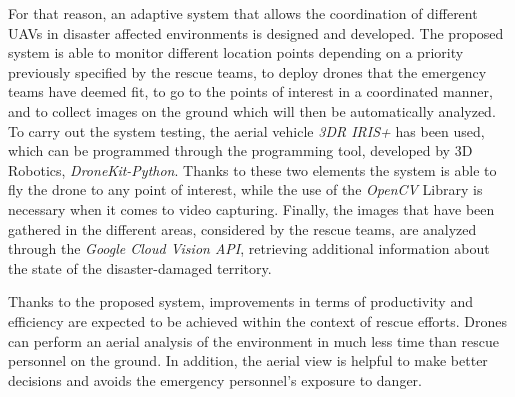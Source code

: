 For that reason, an adaptive system that allows the coordination of different \acs{UAV}s in disaster affected environments is designed and developed. The proposed system is able to monitor different location points depending on a priority previously specified by the rescue teams, to deploy drones that the emergency teams have deemed fit, to go to the points of interest in a coordinated manner, and to collect images on the ground which will then be automatically analyzed. To carry out the system testing, the aerial vehicle \textit{3DR IRIS+} has been used, which can be programmed through the programming tool, developed by 3D Robotics, \textit{DroneKit-Python}. Thanks to these two elements the system is able to fly the drone to any point of interest, while the use of the \textit{OpenCV} Library is necessary when it comes to video capturing. Finally, the images that have been gathered in the different areas, considered by the rescue teams, are analyzed through the \textit{Google Cloud Vision \acs{API}}, retrieving additional information about the state of the disaster-damaged territory.

Thanks to the proposed system, improvements in terms of productivity and efficiency are expected to be achieved within the context of rescue efforts. Drones can perform an aerial analysis of the environment in much less time than rescue personnel on the ground. In addition, the aerial view is helpful to make better decisions and avoids the emergency personnel's exposure to danger.

